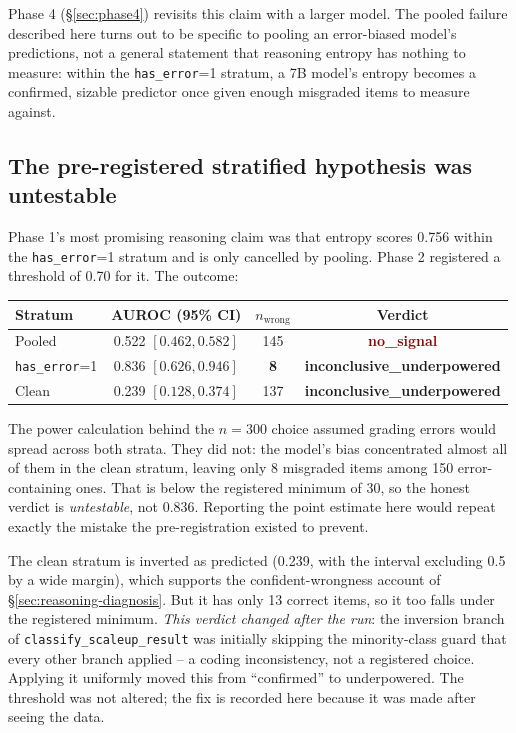 \documentclass[11pt]{article}
\newcommand{\failed}[1]{\textcolor{darkred}{\textbf{#1}}}
\newcommand{\unresolved}[1]{\textcolor{darkamber}{\textbf{#1}}}
\begin{document}
Phase 4 (\S\ref{sec:phase4}) revisits this claim with a larger model. The
pooled failure described here turns out to be specific to pooling an
error-biased model's predictions, not a general statement that reasoning
entropy has nothing to measure: within the \texttt{has\_error}=1 stratum,
a 7B model's entropy becomes a confirmed, sizable predictor once given
enough misgraded items to measure against.

\subsection{The pre-registered stratified hypothesis was untestable}
\label{sec:phase1-stratified-untestable}

Phase 1's most promising reasoning claim was that entropy scores 0.756 within
the \texttt{has\_error}=1 stratum and is only cancelled by pooling. Phase 2
registered a threshold of 0.70 for it. The outcome:

\begin{center}
\begin{tabular}{lccc}
\toprule
Stratum & AUROC (95\% CI) & $n_{\text{wrong}}$ & Verdict \\
\midrule
Pooled & 0.522 $[0.462, 0.582]$ & 145 & \failed{no\_signal} \\
\texttt{has\_error}=1 & 0.836 $[0.626, 0.946]$ & \textbf{8} & \unresolved{inconclusive\_underpowered} \\
Clean & 0.239 $[0.128, 0.374]$ & 137 & \unresolved{inconclusive\_underpowered} \\
\bottomrule
\end{tabular}
\end{center}

The power calculation behind the $n=300$ choice assumed grading errors would
spread across both strata. They did not: the model's bias concentrated almost
all of them in the clean stratum, leaving only 8 misgraded items among 150
error-containing ones. That is below the registered minimum of 30, so the
honest verdict is \emph{untestable}, not 0.836. Reporting the point estimate
here would repeat exactly the mistake the pre-registration existed to prevent.

The clean stratum is inverted as predicted (0.239, with the interval excluding
0.5 by a wide margin), which supports the confident-wrongness account of
\S\ref{sec:reasoning-diagnosis}. But it has only 13 correct items, so it too
falls under the registered minimum. \emph{This verdict changed after the run}:
the inversion branch of \texttt{classify\_scaleup\_result} was initially
skipping the minority-class guard that every other branch applied -- a coding
inconsistency, not a registered choice. Applying it uniformly moved this from
``confirmed'' to underpowered. The threshold was not altered; the fix is
recorded here because it was made after seeing the data.
\end{document}
